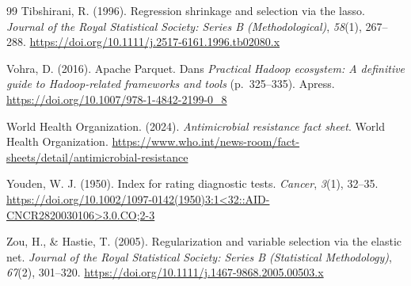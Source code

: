 \documentclass[11pt,a4paper]{article}
\begin{document}
\begin{thebibliography}{99}
Tibshirani, R. (1996). Regression shrinkage and selection via the lasso. \textit{Journal of the Royal Statistical Society: Series B (Methodological)}, \textit{58}(1), 267--288. \url{https://doi.org/10.1111/j.2517-6161.1996.tb02080.x}

Vohra, D. (2016). Apache Parquet. Dans \textit{Practical Hadoop ecosystem: A definitive guide to Hadoop-related frameworks and tools} (p.~325--335). Apress. \url{https://doi.org/10.1007/978-1-4842-2199-0_8}

World Health Organization. (2024). \textit{Antimicrobial resistance fact sheet}. World Health Organization. \url{https://www.who.int/news-room/fact-sheets/detail/antimicrobial-resistance}

Youden, W. J. (1950). Index for rating diagnostic tests. \textit{Cancer}, \textit{3}(1), 32--35. \url{https://doi.org/10.1002/1097-0142(1950)3:1<32::AID-CNCR2820030106>3.0.CO;2-3}

Zou, H., \& Hastie, T. (2005). Regularization and variable selection via the elastic net. \textit{Journal of the Royal Statistical Society: Series B (Statistical Methodology)}, \textit{67}(2), 301--320. \url{https://doi.org/10.1111/j.1467-9868.2005.00503.x}

\end{thebibliography}
\end{document}
